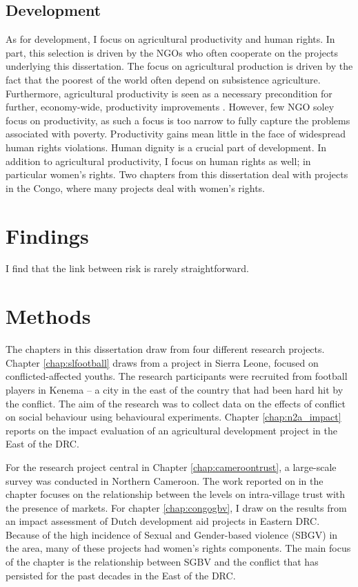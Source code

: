 \subsection{Development}
As for development, I focus on agricultural productivity and human rights. In part, this selection is driven by the NGOs who often cooperate on the projects underlying this dissertation. The focus on agricultural production is driven by the fact that the poorest of the world often depend on subsistence agriculture. Furthermore, agricultural productivity is seen as a necessary precondition for further, economy-wide, productivity improvements \citep{WorldBank2008}. However, few NGO soley focus on productivity, as such a focus is too narrow to fully capture the problems associated with poverty. Productivity gains mean little in the face of widespread human rights violations. Human dignity is a crucial part of development. In addition to agricultural productivity, I focus on human rights as well; in particular women's rights. Two chapters from this dissertation deal with projects in the Congo, where many projects deal with women's rights.


\section{Findings}
I find that the link between risk is rarely straightforward.

\section{Methods}
The chapters in this dissertation draw from four different research projects. Chapter \ref{chap:slfootball} draws from a project in Sierra Leone, focused on conflicted-affected youths. The research participants were recruited from football players in Kenema -- a city in the east of the country that had been hard hit by the conflict. The aim of the research was to collect data on the effects of conflict on social behaviour using behavioural experiments. Chapter \ref{chap:n2a_impact} reports on the impact evaluation of an agricultural development project in the East of the DRC. 

For the research project central in Chapter \ref{chap:cameroontrust}, a large-scale survey was conducted in Northern Cameroon. The work reported on in the chapter focuses on the relationship between the levels on intra-village trust with the presence of markets. For chapter \ref{chap:congogbv}, I draw on the results from an impact assessment of Dutch development aid projects in Eastern DRC. Because of the high incidence of Sexual and Gender-based violence (SBGV) in the area, many of these projects had women's rights components. The main focus of the chapter is the relationship between SGBV and the conflict that has persisted for the past decades in the East of the DRC. 

